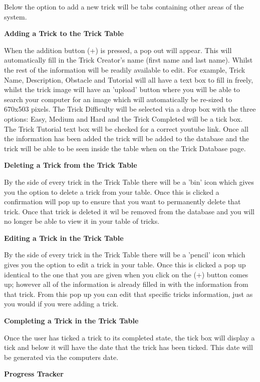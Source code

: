 Below the option to add a new trick will be tabs containing other areas of the system.

\textbf{Adding a Trick to the Trick Table}

When the addition button (+) is pressed, a pop out will appear. This will automatically fill in the Trick Creator's name (first name and last name). Whilst the rest of the information will be readily available to edit. For example, Trick Name, Description, Obstacle and Tutorial will all have a text box to fill in freely, whilst the trick image will have an 'upload' button where you will be able to search your computer for an image which will automatically be re-sized to 670x503 pixels. The Trick Difficulty will be selected via a drop box with the three options: Easy, Medium and Hard and the Trick Completed will be a tick box. The Trick Tutorial text box will be checked for a correct youtube link. Once all the information has been added the trick will be added to the database and the trick will be able to be seen inside the table when on the Trick Database page. 

\textbf{Deleting a Trick from the Trick Table}

By the side of every trick in the Trick Table there will be a 'bin' icon which gives you the option to delete a trick from your table. Once this is clicked a confirmation will pop up to ensure that you want to permanently delete that trick. Once that trick is deleted it wil be removed from the database and you will no longer be able to view it in your table of tricks.

\textbf{Editing a Trick in the Trick Table}

By the side of every trick in the Trick Table there will be a 'pencil' icon which gives you the option to edit a trick in your table. Once this is clicked a pop up identical to the one that you are given when you click on the (+) button comes up; however all of the information is already filled in with the information from that trick. From this pop up you can edit that specific tricks information, just as you would if you were adding a trick.

\textbf{Completing a Trick in the Trick Table}

Once the user has ticked a trick to its completed state, the tick box will display a tick and below it will have the date that the trick has been ticked. This date will be generated via the computers date. 


\textbf{Progress Tracker}

